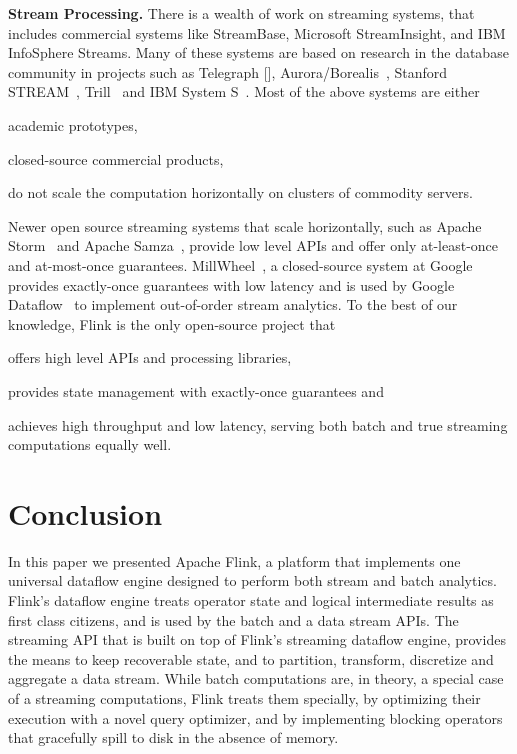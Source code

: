 \documentclass{sig-alternate}
\begin{document}
\textbf{Stream Processing.} There is a wealth of work on streaming systems, that includes commercial systems like StreamBase, Microsoft StreamInsight, and IBM InfoSphere Streams. Many of these systems are based on research in the database community in projects such as Telegraph [], Aurora/Borealis~\cite{abadi2005design}, Stanford STREAM~\cite{arasu2004stream}, Trill~\cite{chandramouli2014trill} and IBM System S~\cite{chandramouli2014trill}. Most of the above systems are either
\begin{inparaenum}[i)]
  \item academic prototypes,
  \item closed-source commercial products,
  \item do not scale the computation horizontally on clusters of commodity servers.
\end{inparaenum}
Newer open source streaming systems that scale horizontally, such as Apache Storm~\cite{CUSTOM:web/Storm} and Apache Samza~\cite{CUSTOM:web/Samza}, provide low level APIs and offer only at-least-once and at-most-once guarantees. MillWheel~\cite{akidau2013millwheel}, a closed-source system at Google provides exactly-once guarantees with low latency and is used by Google Dataflow~\cite{akidau2015dataflow} to implement  out-of-order stream analytics. To the best of our knowledge, Flink is the only open-source project that
\begin{inparaenum}[i)]
  \item offers high level APIs and processing libraries,
  \item provides state management with exactly-once guarantees and
  \item achieves high throughput and low latency, serving both batch and true streaming computations equally well.
\end{inparaenum}

\section{Conclusion}

In this paper we presented Apache Flink, a platform that implements one universal dataflow engine designed to perform both stream and batch analytics. Flink's dataflow engine treats operator state and logical intermediate results as first class citizens, and is used by the batch and a data stream APIs. The streaming API that is built on top of  Flink's streaming dataflow engine, provides the means to keep recoverable state, and to partition, transform, discretize and aggregate a data stream. While batch computations are, in theory, a special case of a streaming computations, Flink treats them specially, by optimizing their execution with a novel query optimizer, and by implementing blocking operators that gracefully spill to disk in the absence of memory. 



\end{document}
